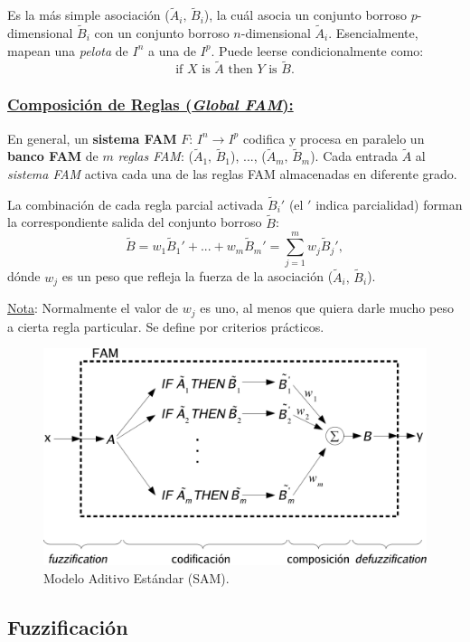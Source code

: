 \documentclass[10pt,a4paper]{article}
\begin{document}
Es la más simple asociación ($\tilde{A}_i,\,\tilde{B}_i$), la cuál asocia un conjunto borroso $p$-dimensional $\tilde{B}_i$ con un conjunto borroso $n$-dimensional $\tilde{A}_i$. Esencialmente, mapean una \textit{pelota} de $I^n$ a una de $I^p$. Puede leerse condicionalmente como:
\[
\text{if $X$ is $\tilde{A}$ then $Y$ is $\tilde{B}$}.
\]

\subsubsection*{\underline{Composición de Reglas (\textit{Global FAM}):}}

En general, un \textbf{sistema FAM} $F:\,I^n\rightarrow I^p$ codifica y procesa en paralelo un \textbf{banco FAM} de $m$ \textit{reglas FAM}: ($\tilde{A}_1,\,\tilde{B}_1$), ..., ($\tilde{A}_m,\,\tilde{B}_m$). Cada entrada $\tilde{A}$ al \textit{sistema FAM} activa cada una de las reglas FAM almacenadas en diferente grado.

La  combinación de cada regla parcial activada $\tilde{B}_i'$ (el $'$ indica parcialidad) forman la correspondiente salida del conjunto borroso $\tilde{B}$:
\[
\tilde{B} = w_1 \tilde{B}_1' + ... + w_m \tilde{B}_m'=\sum_{j=1}^m w_j \tilde{B}_j',
\]
dónde $w_j$ es un peso que refleja la fuerza de la asociación ($\tilde{A}_i,\,\tilde{B}_i$). 

\underline{Nota}: Normalmente el valor de $w_j$ es uno, al menos que quiera darle mucho peso a cierta regla particular. Se define por criterios prácticos.

\begin{figure}[ht!]
  \caption{Modelo Aditivo Estándar (SAM).}
  \label{fig:sam}
  \centerline{\includegraphics[width=0.65\textwidth-\fboxrule-\fboxrule]{imgs/sam.png}}
\end{figure}

\subsection{Fuzzificación}
\end{document}
